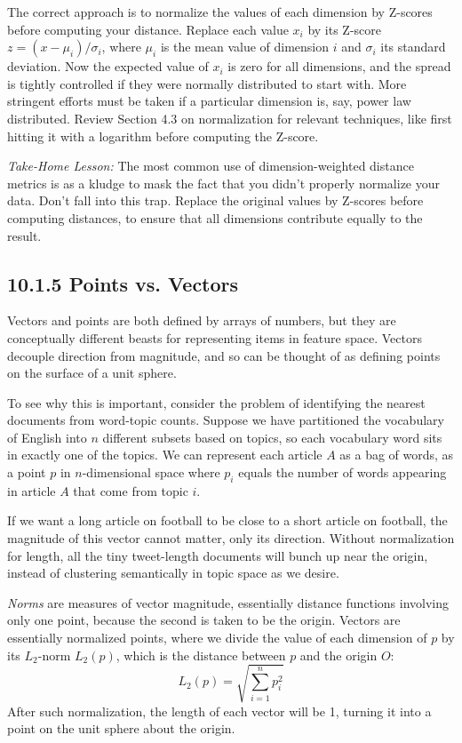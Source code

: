 \documentclass[10pt]{article}
\begin{document}
The correct approach is to normalize the values of each dimension by Z-scores before computing your distance. Replace each value $x_i$ by its Z-score $z = (x-\mu_i)/\sigma_i$, where $\mu_i$ is the mean value of dimension $i$ and $\sigma_i$ its standard deviation. Now the expected value of $x_i$ is zero for all dimensions, and the spread is tightly controlled if they were normally distributed to start with. More stringent efforts must be taken if a particular dimension is, say, power law distributed. Review Section 4.3 on normalization for relevant techniques, like first hitting it with a logarithm before computing the Z-score.

\textit{Take-Home Lesson:} The most common use of dimension-weighted distance metrics is as a kludge to mask the fact that you didn’t properly normalize your data. Don’t fall into this trap. Replace the original values by Z-scores before computing distances, to ensure that all dimensions contribute equally to the result.

\subsection*{10.1.5 Points vs. Vectors}
Vectors and points are both defined by arrays of numbers, but they are conceptually different beasts for representing items in feature space. Vectors decouple direction from magnitude, and so can be thought of as defining points on the surface of a unit sphere.

To see why this is important, consider the problem of identifying the nearest documents from word-topic counts. Suppose we have partitioned the vocabulary of English into $n$ different subsets based on topics, so each vocabulary word sits in exactly one of the topics. We can represent each article $A$ as a bag of words, as a point $p$ in $n$-dimensional space where $p_i$ equals the number of words appearing in article $A$ that come from topic $i$.

If we want a long article on football to be close to a short article on football, the magnitude of this vector cannot matter, only its direction. Without normalization for length, all the tiny tweet-length documents will bunch up near the origin, instead of clustering semantically in topic space as we desire.

\textit{Norms} are measures of vector magnitude, essentially distance functions involving only one point, because the second is taken to be the origin. Vectors are essentially normalized points, where we divide the value of each dimension of $p$ by its $L_2$-norm $L_2(p)$, which is the distance between $p$ and the origin $O$:
\[
L_2(p)=\sqrt{\sum_{i=1}^{n} p_i^2}
\]
After such normalization, the length of each vector will be 1, turning it into a point on the unit sphere about the origin.
\end{document}
